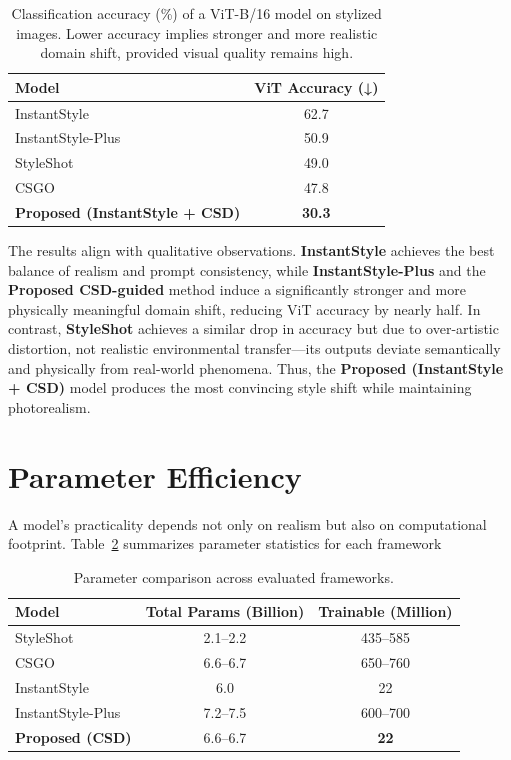 \begin{table}[!h]
\centering
\caption{Classification accuracy (\%) of a ViT-B/16 model on stylized images.  
Lower accuracy implies stronger and more realistic domain shift, provided visual quality remains high.}
\begin{tabular}{|l|c|}
\hline
\textbf{Model} & \textbf{ViT Accuracy (↓)} \\ \hline
InstantStyle & 62.7 \\ 
InstantStyle-Plus & 50.9 \\ 
StyleShot & 49.0 \\ 
CSGO & 47.8 \\ 
\textbf{Proposed (InstantStyle + CSD)} & \textbf{30.3} \\ \hline
\end{tabular}
\label{tab:accuracy}
\end{table}

\noindent
The results align with qualitative observations.  
\textbf{InstantStyle} achieves the best balance of realism and prompt consistency, while \textbf{InstantStyle-Plus} and the \textbf{Proposed CSD-guided} method induce a significantly stronger and more physically meaningful domain shift, reducing ViT accuracy by nearly half.  
In contrast, \textbf{StyleShot} achieves a similar drop in accuracy but due to over-artistic distortion, not realistic environmental transfer—its outputs deviate semantically and physically from real-world phenomena.  
Thus, the \textbf{Proposed (InstantStyle + CSD)} model produces the most convincing style shift while maintaining photorealism.

\section{Parameter Efficiency}
\label{sec:parameter_efficiency}

A model’s practicality depends not only on realism but also on computational footprint.  
Table~\ref{tab:param_compare} summarizes parameter statistics for each framework
\begin{table}[!h]
\centering
\caption{Parameter comparison across evaluated frameworks.}
\begin{tabular}{|l|c|c|}
\hline
\textbf{Model} & \textbf{Total Params (Billion)} & \textbf{Trainable (Million)} \\ \hline
StyleShot & 2.1–2.2 & 435–585 \\ 
CSGO & 6.6–6.7 & 650–760 \\ 
InstantStyle & 6.0 & 22 \\ 
InstantStyle-Plus & 7.2–7.5 &  600–700 \\ 
\textbf{Proposed (CSD)} & 6.6–6.7 & \textbf{22} \\ \hline
\end{tabular}
\label{tab:param_compare}
\end{table}

